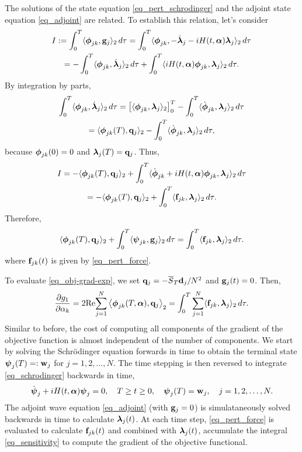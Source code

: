 \documentclass[11pt]{article}
\begin{document}
The solutions of the state equation \eqref{eq_pert_schrodinger} and the adjoint state equation
\eqref{eq_adjoint} are related. To establish this relation, let's consider
\begin{multline}
  I:= \int_0^T \langle \boldsymbol{\phi}_{jk}, {\mathbf g}_j \rangle_2\, d\tau =  \int_0^T \langle \boldsymbol{\phi}_{jk},
  -\dot{\boldsymbol{\lambda}}_j - iH(t,\boldsymbol{\alpha})\boldsymbol{\lambda}_j \rangle_2\, d\tau \\
  =  -\int_0^T \langle  \boldsymbol{\phi}_{jk},
  \dot{\boldsymbol{\lambda}}_{j} \rangle_2\, d\tau +  \int_0^T \langle iH(t,\boldsymbol{\alpha}) \boldsymbol{\phi}_{jk},\boldsymbol{\lambda}_j \rangle_2\, d\tau.
\end{multline}
By integration by parts,
\begin{multline*}
\int_0^T \langle  \phib_{jk}, \dot{\lambdab}_{j} \rangle_2\, d\tau =
%
\left[ \langle \phib_{jk}, \lambdab_j \rangle_2 \right]_0^T - \int_0^T \langle  \dot{\phib}_{jk},
\lambdab_{j} \rangle_2\, d\tau\\
%
= \langle \phib_{jk}(T), \qb_j \rangle_2  - \int_0^T \langle  \dot{\phib}_{jk}, \lambdab_{j} \rangle_2\, d\tau,
\end{multline*}
because $\boldsymbol{\phi}_{jk}(0)=0$ and $\boldsymbol{\lambda}_j(T) = {\mathbf q}_j$. Thus,
\begin{multline*}
I = -\langle \phib_{jk}(T), \qb_j \rangle_2 + \int_0^T \langle \dot{\phib}_{jk} + iH(t,\alphab)
\phib_{jk},\lambdab_j \rangle_2\, d\tau\\
%
= -\langle \phib_{jk}(T), \qb_j \rangle_2 + \int_0^T \langle \fb_{jk},\lambdab_j \rangle_2\, d\tau.
\end{multline*}
Therefore,
\begin{equation}\label{eq_adjoint-rel}
 \langle \boldsymbol{\phi}_{jk}(T), {\mathbf q}_j \rangle_2 + \int_0^T \langle \boldsymbol{\psi}_{jk},{\mathbf g}_j\rangle_2\, d\tau = \int_0^T \langle {\mathbf f}_{jk},\boldsymbol{\lambda}_j \rangle_2\, d\tau.
\end{equation}
where ${\mathbf f}_{jk}(t)$ is given by \eqref{eq_pert_force}.

To evaluate \eqref{eq_obj-grad-exp}, we set ${\mathbf q}_j = -\overline{S}_T {\mathbf d}_j/N^2$ and ${\mathbf g}_j(t)=0$. Then,
\begin{equation}\label{eq_sensitivity}
  \frac{\partial g_1}{\partial \alpha_k} =  2 {\rm Re}\! \sum_{j=1}^N \left\langle \boldsymbol{\phi}_{jk}(T,\boldsymbol{\alpha}),
  {\mathbf q}_j\right\rangle_2 =
  \int_0^T \sum_{j=1}^N \langle {\mathbf f}_{jk},\boldsymbol{\lambda}_j \rangle_2\, d\tau.
\end{equation}
Similar to before, the cost of computing all components of the gradient of the objective function is
almost independent of the number of components. We start by solving the Schr\"odinger equation
forwards in time to obtain the terminal state $\boldsymbol{\psi}_j(T)=:{\mathbf w}_j$ for $j=1,2,\ldots,N$. The time
stepping is then reversed to integrate \eqref{eq_schrodinger} backwards in time,
\begin{equation}
\dot{\boldsymbol{\psi}}_j + iH(t,\boldsymbol{\alpha})\boldsymbol{\psi}_j=0,\quad T\geq t\geq 0, \quad \boldsymbol{\psi}_j(T)={\mathbf w}_j,\quad j=1,2,\ldots,N.
\end{equation}
The adjoint wave equation \eqref{eq_adjoint}  (with ${\mathbf g}_j=0$) is simulataneously solved backwards in time to
calculate $\boldsymbol{\lambda}_j(t)$. At each time step, \eqref{eq_pert_force} is evaluated to calculate ${\mathbf f}_{jk}(t)$ and combined with
$\boldsymbol{\lambda}_j(t)$, accumulate the integral \eqref{eq_sensitivity} to compute the gradient of the
objective functional.
\end{document}
